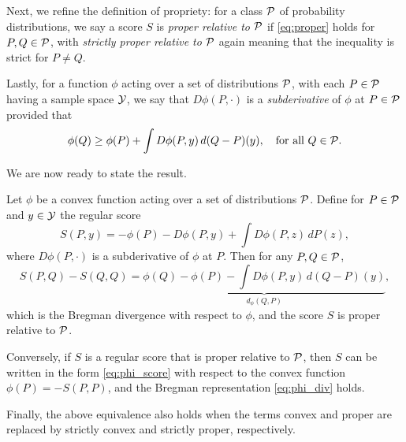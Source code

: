 \documentclass{article}
\begin{document}
Next, we refine the definition of propriety: for a class $\mathcal{P}$ of probability
distributions, we say a score $S$ is \emph{proper relative to $\mathcal{P}$} if
\eqref{eq:proper} holds for $P,Q \in \mathcal{P}$, with \emph{strictly proper relative 
  to $\mathcal{P}$} again meaning that the inequality is strict for $P \not= Q$.  

Lastly, for a function $\phi$ acting over a set of distributions $\mathcal{P}$, with
each $P \in \mathcal{P}$ having a sample space $\mathcal{Y}$, we say that $D\phi(P, \cdot)$ is a
\emph{subderivative} of $\phi$ at $P \in \mathcal{P}$ provided that 
\begin{equation}
\label{eq:subderiv}
\phi(Q) \geq \phi(P) + \int D\phi(P, y) \, d(Q-P)(y), \quad \text{for all $Q \in
  \mathcal{P}$}.  
\end{equation}

We are now ready to state the result. 

\begin{theorem}
Let $\phi$ be a convex function acting over a set of distributions $\mathcal{P}$. Define
for $P \in \mathcal{P}$ and $y \in \mathcal{Y}$ the regular score  
\begin{equation}
\label{eq:phi_score}
S(P, y) = -\phi(P) - D\phi(P, y) + \int D\phi(P, z) \, dP(z),
\end{equation}
where $D\phi(P, \cdot)$ is a subderivative of $\phi$ at $P$. Then for any $P,Q
\in \mathcal{P}$, 
\begin{equation}
\label{eq:phi_div}
S(P, Q) - S(Q, Q) = \underbrace{\phi(Q) - \phi(P) - \int D\phi(P, y) \,
  d(Q-P)(y)}_{d_\phi(Q,P)},
\end{equation}
which is the Bregman divergence with respect to $\phi$, and the score $S$ is
proper relative to $\mathcal{P}$.  

Conversely, if $S$ is a regular score that is proper relative to $\mathcal{P}$, then $S$
can be written in the form \eqref{eq:phi_score} with respect to the convex
function $\phi(P) = -S(P, P)$, and the Bregman representation \eqref{eq:phi_div}
holds.    

Finally, the above equivalence also holds when the terms convex and proper are
replaced by strictly convex and strictly proper, respectively.  
\end{theorem}
\end{document}
